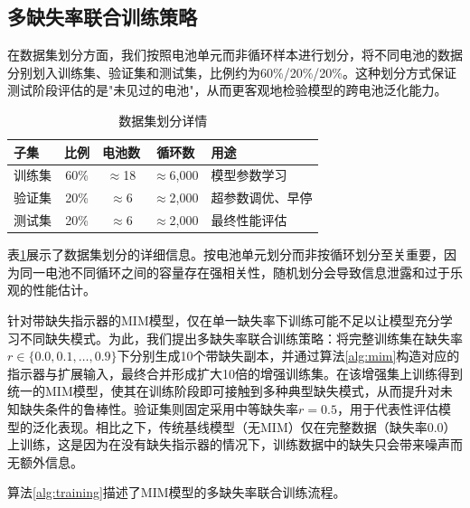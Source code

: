 \documentclass[10pt,a4paper]{ctexart}
\begin{document}
\subsection{多缺失率联合训练策略}

在数据集划分方面，我们按照电池单元而非循环样本进行划分，将不同电池的数据分别划入训练集、验证集和测试集，比例约为60\%/20\%/20\%。这种划分方式保证测试阶段评估的是"未见过的电池"，从而更客观地检验模型的跨电池泛化能力。

\begin{table}[H]
\centering
\caption{数据集划分详情}
\label{tab:data_split}
\begin{tabular}{@{}lcccp{5cm}@{}}
\toprule
\textbf{子集} & \textbf{比例} & \textbf{电池数} & \textbf{循环数} & \textbf{用途} \\
\midrule
训练集 & 60\% & $\approx$18 & $\approx$6,000 & 模型参数学习 \\
验证集 & 20\% & $\approx$6 & $\approx$2,000 & 超参数调优、早停 \\
测试集 & 20\% & $\approx$6 & $\approx$2,000 & 最终性能评估 \\
\bottomrule
\end{tabular}
\end{table}

表\ref{tab:data_split}展示了数据集划分的详细信息。按电池单元划分而非按循环划分至关重要，因为同一电池不同循环之间的容量存在强相关性，随机划分会导致信息泄露和过于乐观的性能估计。

针对带缺失指示器的MIM模型，仅在单一缺失率下训练可能不足以让模型充分学习不同缺失模式。为此，我们提出多缺失率联合训练策略：将完整训练集在缺失率$r \in \{0.0, 0.1, \ldots, 0.9\}$下分别生成10个带缺失副本，并通过算法\ref{alg:mim}构造对应的指示器与扩展输入，最终合并形成扩大10倍的增强训练集。在该增强集上训练得到统一的MIM模型，使其在训练阶段即可接触到多种典型缺失模式，从而提升对未知缺失条件的鲁棒性。验证集则固定采用中等缺失率$r=0.5$，用于代表性评估模型的泛化表现。相比之下，传统基线模型（无MIM）仅在完整数据（缺失率0.0）上训练，这是因为在没有缺失指示器的情况下，训练数据中的缺失只会带来噪声而无额外信息。

算法\ref{alg:training}描述了MIM模型的多缺失率联合训练流程。
\end{document}

